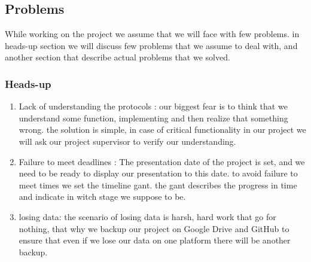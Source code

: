 \documentclass[12pt]{article}
\begin{document}
\subsection{Problems}
While working on the project we assume that we will face with few problems. in heads-up section we will discuss few problems that we assume to deal with, and another section that describe actual problems that we solved.
\subsubsection{Heads-up}
\begin{enumerate}
	\item Lack of understanding the protocols : our biggest fear is to think that we understand some function, implementing and then realize that something wrong. the solution is simple, in case of critical functionality in our project we will ask our project supervisor to verify our understanding. 
	
	\item Failure to meet deadlines : The presentation date of the project is set, and we need to be ready to display our presentation to this date. to avoid failure to meet times we set the timeline gant. the gant describes the progress in time and indicate in witch stage we suppose to be.
	
	\item losing data: the scenario of losing data is harsh, hard work that go for nothing, that why we backup our project on Google Drive and GitHub to ensure that even if we lose our data on one platform there will be another backup.
	
\end{enumerate}
\end{document}
